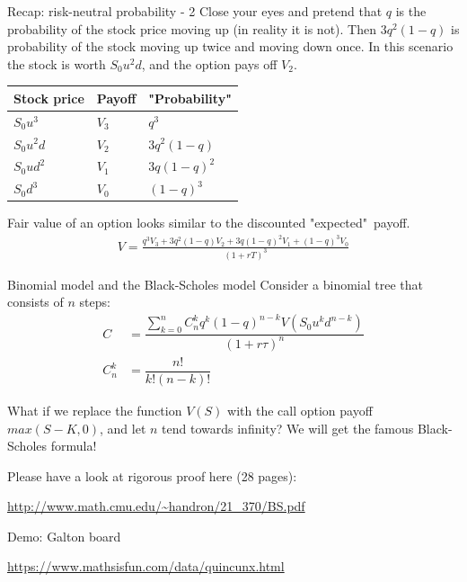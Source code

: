 \documentclass{beamer}
\begin{document}
\begin{frame}{Recap: risk-neutral probability - 2}
\justify
Close your eyes and pretend that $q$ is the probability of the stock price moving up (in reality it is not). Then $3q^2(1-q)$ is probability of the stock moving up twice and moving down once. In this scenario the stock is worth  $S_0u^2d$, and the option pays off $V_2$.

\justify
\centering
\begin{tabular}{l|l|l}
Stock price & Payoff & "Probability" \\ \hline
$S_0u^3$   & $V_3$   & $q^3$ \\
$S_0u^2d$  & $V_2$   & $3q^2(1-q)$ \\
$S_0ud^2$  & $V_1$   & $3q(1-q)^2$ \\ 
$S_0d^3$   & $V_0$   & $(1-q)^3$ 
\end{tabular}

\justify
Fair value of an option looks similar to the discounted "expected"\ payoff.
\begin{align*}
V = \frac{q^3V_3 + 3q^2(1-q)V_2 + 3q(1-q)^2V_1 + (1-q)^3V_0}{(1+rT)^3}
\end{align*}
\end{frame}



\begin{frame}{Binomial model and the Black-Scholes model}
Consider a binomial tree that consists of $n$ steps:
\begin{align*}
C &= \dfrac{\sum\limits_{k=0}^{n} C^k_nq^k(1-q)^{n-k}V(S_0u^kd^{n-k})}{(1+r\tau)^n} \\
C^k_n &= \dfrac{n!}{k!(n-k)!}
\end{align*}

\justify
What if we replace the function $V(S)$ with the call option payoff $max(S-K,0)$, and let $n$ tend towards infinity? We will get the famous Black-Scholes formula!

\justify
Please have a look at rigorous proof here (28 pages):

\url{http://www.math.cmu.edu/~handron/21_370/BS.pdf}
\end{frame}



\begin{frame}{Demo: Galton board}

\url{https://www.mathsisfun.com/data/quincunx.html}
\end{frame}
\end{document}
